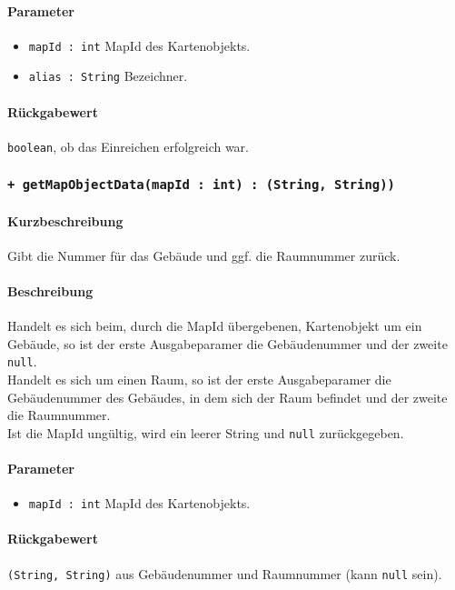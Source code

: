\paragraph*{Parameter}
\begin{itemize}
    \item \texttt{mapId : int} MapId des Kartenobjekts.
    \item \texttt{alias : String} Bezeichner.
\end{itemize}
\paragraph*{Rückgabewert}
\texttt{boolean}, ob das Einreichen erfolgreich war.

\subsubsection*{\texttt{+ getMapObjectData(mapId : int) : (String, String))}}%
\paragraph*{Kurzbeschreibung}
Gibt die Nummer für das Gebäude und ggf. die Raumnummer zurück.
\paragraph*{Beschreibung}
Handelt es sich beim, durch die MapId übergebenen, Kartenobjekt um ein Gebäude, 
so ist der erste Ausgabeparamer die Gebäudenummer und der zweite \texttt{null}.\\
Handelt es sich um einen Raum, so ist der erste Ausgabeparamer die Gebäudenummer des Gebäudes, 
in dem sich der Raum befindet und der zweite die Raumnummer.\\
Ist die MapId ungültig, wird ein leerer String und \texttt{null} zurückgegeben.
\paragraph*{Parameter}
\begin{itemize}
    \item \texttt{mapId : int} MapId des Kartenobjekts.
\end{itemize}
\paragraph*{Rückgabewert}
\texttt{(String, String)} aus Gebäudenummer und Raumnummer (kann \texttt{null} sein).


